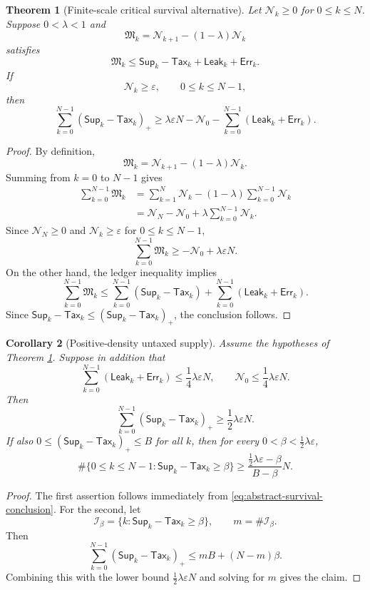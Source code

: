 \documentclass[11pt]{article}
\numberwithin{equation}{section}
\newtheorem{theorem}{Theorem}[section]
\newtheorem{corollary}[theorem]{Corollary}
\newcommand{\eps}{\varepsilon}
\newcommand{\Supp}{\mathsf{Sup}}
\newcommand{\Tax}{\mathsf{Tax}}
\newcommand{\Leak}{\mathsf{Leak}}
\newcommand{\Err}{\mathsf{Err}}
\newcommand{\Mres}{\mathfrak M}
\newcommand{\pos}[1]{\left(#1\right)_+}
\newcommand{\N}{\mathcal N}
\begin{document}
\begin{theorem}[Finite-scale critical survival alternative]\label{thm:abstract-survival}
Let $\N_k\geq0$ for $0\leq k\leq N$.  Suppose $0<\lambda<1$ and
\[
\Mres_k=\N_{k+1}-(1-\lambda)\N_k
\]
satisfies
\[
\Mres_k\leq \Supp_k-\Tax_k+\Leak_k+\Err_k.
\]
If
\[
\N_k\geq \eps,
\qquad 0\leq k\leq N-1,
\]
then
\begin{equation}\label{eq:abstract-survival-conclusion}
\sum_{k=0}^{N-1}\pos{\Supp_k-\Tax_k}
\geq
\lambda\eps N-\N_0-
\sum_{k=0}^{N-1}(\Leak_k+\Err_k).
\end{equation}
\end{theorem}

\begin{proof}
By definition,
\[
\Mres_k=\N_{k+1}-(1-\lambda)\N_k.
\]
Summing from $k=0$ to $N-1$ gives
\begin{align*}
\sum_{k=0}^{N-1}\Mres_k
&=\sum_{k=1}^{N}\N_k-(1-\lambda)\sum_{k=0}^{N-1}\N_k\\
&=\N_N-\N_0+\lambda\sum_{k=0}^{N-1}\N_k.
\end{align*}
Since $\N_N\geq0$ and $\N_k\geq \eps$ for $0\leq k\leq N-1$,
\[
\sum_{k=0}^{N-1}\Mres_k
\geq -\N_0+\lambda\eps N.
\]
On the other hand, the ledger inequality implies
\[
\sum_{k=0}^{N-1}\Mres_k
\leq \sum_{k=0}^{N-1}(\Supp_k-\Tax_k)
+\sum_{k=0}^{N-1}(\Leak_k+\Err_k).
\]
Since $\Supp_k-\Tax_k\leq \pos{\Supp_k-\Tax_k}$, the conclusion follows.
\end{proof}

\begin{corollary}[Positive-density untaxed supply]\label{cor:positive-density}
Assume the hypotheses of Theorem \ref{thm:abstract-survival}.  Suppose in addition that
\[
\sum_{k=0}^{N-1}(\Leak_k+\Err_k)\leq \frac14\lambda\eps N,
\qquad
\N_0\leq \frac14\lambda\eps N.
\]
Then
\[
\sum_{k=0}^{N-1}\pos{\Supp_k-\Tax_k}
\geq \frac12\lambda\eps N.
\]
If also $0\leq\pos{\Supp_k-\Tax_k}\leq B$ for all $k$, then for every $0<\beta<\frac12\lambda\eps$,
\[
\#\{0\leq k\leq N-1:\Supp_k-\Tax_k\geq\beta\}
\geq
\frac{\frac12\lambda\eps-\beta}{B-\beta}N.
\]
\end{corollary}

\begin{proof}
The first assertion follows immediately from \eqref{eq:abstract-survival-conclusion}.  For the second, let
\[
\mathcal I_\beta=\{k:\Supp_k-\Tax_k\geq\beta\},
\qquad m=\#\mathcal I_\beta.
\]
Then
\[
\sum_{k=0}^{N-1}\pos{\Supp_k-\Tax_k}\leq mB+(N-m)\beta.
\]
Combining this with the lower bound $\frac12\lambda\eps N$ and solving for $m$ gives the claim.
\end{proof}
\end{document}
